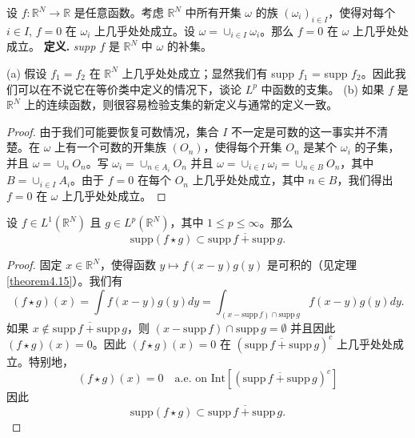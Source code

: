 \begin{proposition}[以及支集的定义]\label{proposition4.17}
设 $f: \mathbb{R}^N \to \mathbb{R}$ 是任意函数。考虑 $\mathbb{R}^N$ 中所有开集 $\omega$ 的族 $(\omega_i)_{i \in I}$，使得对每个 $i \in I$, $f=0$ 在 $\omega_i$ 上几乎处处成立。设 $\omega = \cup_{i \in I} \omega_i$。那么 $f=0$ 在 $\omega$ 上几乎处处成立。
\textbf{定义.} \textit{supp $f$} 是 $\mathbb{R}^N$ 中 $\omega$ 的补集。
\end{proposition}



\begin{remark}
(a) 假设 $f_1 = f_2$ 在 $\mathbb{R}^N$ 上几乎处处成立；显然我们有 supp $f_1$ = supp $f_2$。因此我们可以在不说它在等价类中定义的情况下，谈论 $L^p$ 中函数的支集。
(b) 如果 $f$ 是 $\mathbb{R}^N$ 上的连续函数，则很容易检验支集的新定义与通常的定义一致。
\end{remark}

\begin{proof}
由于我们可能要恢复可数情况，集合 $I$ 不一定是可数的这一事实并不清楚。在 $\omega$ 上有一个可数的开集族 $(O_n)$，使得每个开集 $O_n$ 是某个 $\omega_i$ 的子集，并且 $\omega = \cup_n O_n$。写 $\omega_i = \cup_{n \in A_i} O_n$ 并且 $\omega = \cup_{i \in I} \omega_i = \cup_{n \in B} O_n$，其中 $B = \cup_{i \in I} A_i$。由于 $f=0$ 在每个 $O_n$ 上几乎处处成立，其中 $n \in B$，我们得出 $f=0$ 在 $\omega$ 上几乎处处成立。
\end{proof}

\begin{proposition}\label{proposition4.18}
设 $f \in L^1(\mathbb{R}^N)$ 且 $g \in L^p(\mathbb{R}^N)$，其中 $1 \le p \le \infty$。那么
\[ \mathrm{supp}(f \star g) \subset \overline{\mathrm{supp}\,f + \mathrm{supp}\,g}. \]
\end{proposition}

\begin{proof}
固定 $x \in \mathbb{R}^N$，使得函数 $y \mapsto f(x-y)g(y)$ 是可积的（见定理 \ref{theorem4.15}）。我们有
\[ (f \star g)(x) = \int f(x-y)g(y)dy = \int_{(x-\mathrm{supp}\,f) \cap \mathrm{supp}\,g} f(x-y)g(y)dy. \]
如果 $x \notin \overline{\mathrm{supp}\,f + \mathrm{supp}\,g}$，则 $(x-\mathrm{supp}\,f) \cap \mathrm{supp}\,g = \emptyset$ 并且因此 $(f \star g)(x) = 0$。因此 $(f \star g)(x) = 0$ 在 $(\overline{\mathrm{supp}\,f + \mathrm{supp}\,g})^c$ 上几乎处处成立。特别地，
\[ (f \star g)(x) = 0 \quad \text{a.e. on } \mathrm{Int}[(\overline{\mathrm{supp}\,f + \mathrm{supp}\,g})^c] \]
因此
\[ \mathrm{supp}(f \star g) \subset \overline{\mathrm{supp}\,f + \mathrm{supp}\,g}. \]
\end{proof}

